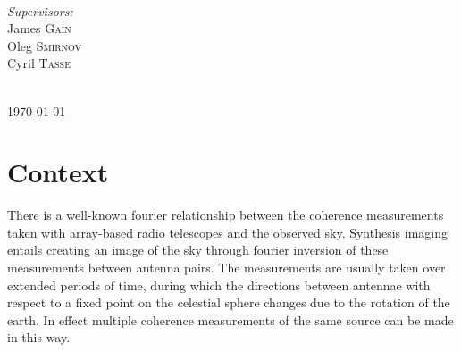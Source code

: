 \documentclass[a4paper,10pt]{article}
\begin{document}
\begin{titlepage}
\begin{minipage}{0.4\textwidth}
\begin{flushleft}
\end{flushleft}
\end{minipage}
~
\begin{minipage}{0.4\textwidth}
\begin{flushright} \large
\emph{Supervisors:} \\
James \textsc{Gain} \\
Oleg \textsc{Smirnov} \\
Cyril \textsc{Tasse}\\
\end{flushright}
\end{minipage}\\[3cm]


{\large \today}\\[1.5cm] %
\vfill %

\end{titlepage}

\tableofcontents
\pagebreak
\listoffigures
\pagebreak
\section{Context}
There is a well-known fourier relationship between the coherence measurements taken with array-based radio telescopes and
the observed sky. Synthesis imaging entails creating an image of the sky through fourier inversion of these 
measurements between antenna pairs. The measurements are usually taken over extended periods of time, during which the 
directions between antennae with respect to a fixed point on the celestial sphere changes due to the rotation of the earth.
In effect multiple coherence measurements of the same source can be made in this way.
\end{document}
